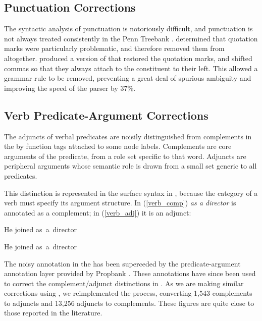 \documentclass[11pt]{article}
\begin{document}
\subsection{Punctuation Corrections}

The syntactic analysis of punctuation is notoriously difficult, and punctuation
is not
always treated consistently in the Penn Treebank \citep{bies:95}.
\citet{hock:thesis03} determined that quotation marks were particularly
problematic, and therefore removed them from \ccgbank altogether.
\citet{tse:08} produced a version of \ccgbank that restored the quotation marks,
and shifted commas so that they always attach to the constituent to their left.
This allowed a  grammar rule to be removed, preventing
a great deal of spurious ambiguity and improving the speed of the \candc parser
\citep{clark:cl07} by 37\%.

\subsection{Verb Predicate-Argument Corrections}

The adjuncts of verbal predicates are noisily distinguished from complements in
the \penn by function tags attached to some node labels. Complements are core
arguments of the predicate, from a role set specific to that word. Adjuncts are
peripheral arguments whose semantic role is drawn from a small set generic to
all predicates.

This distinction is represented in the surface syntax in \ccg, because the
category of a verb must specify its argument structure. In (\ref{verb_comp})
\emph{as a director} is annotated as a complement; in (\ref{verb_adj}) it
is an adjunct:

\begin{lexamples}
 \item \gll He joined as~a~director
         
       \gln 
       \glend \label{verb_comp}
\item \gll He joined as~a~director
         
       \gln 
       \glend \label{verb_adj}
\end{lexamples}

The noisy annotation in the \penn has been superceded by the predicate-argument
annotation layer provided by Propbank \citep{propbank}. These annotations have
since been used to correct the complement/adjunct distinctions in \ccgbank
\citep[Honnibal and Curran (2007);][]{boxwell:08}. As we are making similar
corrections using \nombank, we reimplemented the process, converting 1,543
complements to adjuncts and 13,256 adjuncts to complements.
These figures are quite close to those reported in the literature.
\end{document}
